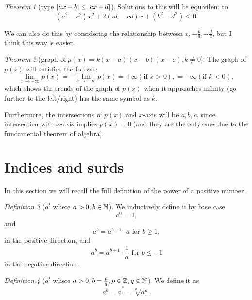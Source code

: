 \documentclass[8pt]{article}
\theoremstyle{remark}
\newtheorem{theorem}{Theorem}[section]
\newtheorem{definition}[theorem]{Definition}
\begin{document}
        \begin{theorem}[type $\left\lvert ax + b \right\rvert \leq \left\lvert cx + d \right\rvert$]
            Solutions to this will be equivilent to
            $$
            (a^2 - c^2) x^2 + 2(ab - cd)x + (b^2 - d^2) \leq 0.
            $$

            We can also do this by considering the relationship between $x, -\frac{b}{a}, -\frac{d}{c}$, but I think this way is easier.
        \end{theorem}

        \begin{theorem}[graph of $p(x) = k (x-a) (x-b) (x-c), k \neq 0$]
            The graph of $p(x)$ will satisfies the follows:
            $$
                \lim_{x \rightarrow +\infty} p(x) = - \lim_{x \rightarrow -\infty} p(x) = +\infty (\text{if $k$ > 0}), = -\infty (\text{if $k$ < 0}),
            $$
            which shows the trends of the graph of $p(x)$ when it approaches infinity (go further to the left/right) has the same symbol as $k$.

            Furthermore, the intersections of $p(x)$ and $x$-axis will be $ a, b, c$, since intersection with $x$-axis implies $p(x) = 0$ (and they are the only ones due to the fundamental theorem of algebra).
        \end{theorem}

    \section{Indices and surds}
        In this section we will recall the full definition of the power of a positive number.

        \begin{definition}[$a^b$ where $a > 0, b \in \mathbb{N}$]
            We inductively define it by base case
            $$a^0 = 1,$$
            and $$a^b = a^{b - 1} \cdot a\text{ for } b \geq 1,$$
            in the positive direction, and
            $$a^b = a^{b + 1} \cdot \frac{1}{a}\text{ for } b \leq -1$$
            in the negative direction.
        \end{definition}

        \begin{definition}[$a^b$ where $a > 0, b = \frac{p}{q}, p \in \mathbb{Z}, q \in \mathbb{N}$]
            We define it as
            $$
                a^{b} = a^{\frac{p}{q}} = \sqrt[q]{a^p}.
            $$
        \end{definition}
\end{document}
